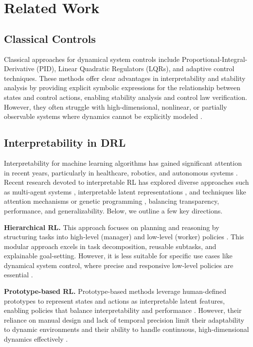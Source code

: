 \section{Related Work}
\subsection{Classical Controls} 
Classical approaches for dynamical system controls include Proportional-Integral-Derivative (PID), Linear Quadratic Regulators (LQRs), and adaptive control techniques\cite{aastrom2006advanced, swarnkar2014adaptive}. These methods offer clear advantages in interpretability and stability analysis by providing explicit symbolic expressions for the relationship between states and control actions, enabling stability analysis and control law verification. However, they often struggle with high-dimensional, nonlinear, or partially observable systems where dynamics cannot be explicitly modeled \cite{skogestad2005multivariable}. 


\subsection{Interpretability in DRL} 
Interpretability for machine learning algorithms has gained significant attention in recent years, particularly in healthcare, robotics, and autonomous systems \cite{glanois2024survey, yu2023reinforcement, wells2021explainable, heuillet2021explainability}. Recent research devoted to interpretable RL has explored diverse approaches such as multi-agent systems \cite{zabounidis2023concept}, interpretable latent representations \cite{chen2021interpretable}, and techniques like attention mechanisms \cite{mott2019towards} or genetic programming \cite{hein2018interpretable}, balancing transparency, performance, and generalizability. Below, we outline a few key directions.

\textbf{Hierarchical RL.} This approach focuses on planning and reasoning by structuring tasks into high-level (manager) and low-level (worker) policies \cite{lyu2019sdrl, nachum2018data, pateria2021hierarchical}. This modular approach excels in task decomposition, reusable subtasks, and explainable goal-setting. However, it is less suitable for specific use cases like dynamical system control, where precise and responsive low-level policies are essential \cite{florensa2017stochastic}.

\textbf{Prototype-based RL.} 
Prototype-based methods leverage human-defined prototypes to represent states and actions as interpretable latent features, enabling policies that balance interpretability and performance \cite{kenny2023towards, xiong2023interpretable, yarats2021reinforcement, biehl2016prototype}. However, their reliance on manual design and lack of temporal precision limit their adaptability to dynamic environments and their ability to handle continuous, high-dimensional dynamics effectively \cite{duan2016benchmarking}.


